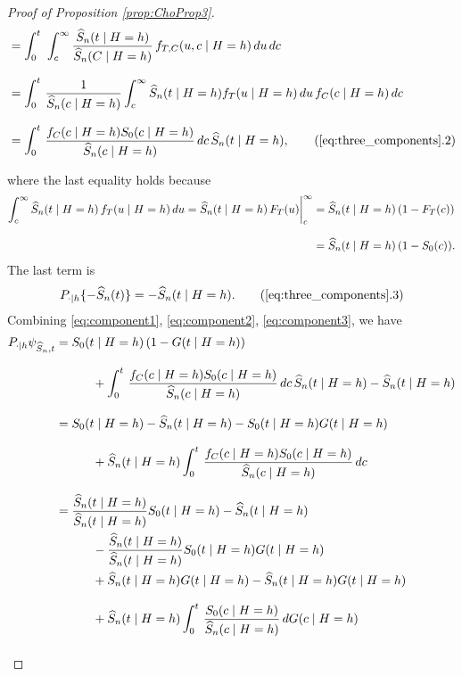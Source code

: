 \begin{proof}[Proof of Proposition \ref{prop:ChoProp3}]
{\begin{align}
&=\intzerotot \, \intc \fracCheh \, f_{T,C}(u,c \mid \heh )\, du \, dc \notag \eqnspace
&=\intzerotot \frac{1}{\Snhat\argcheh} \intc \Snhat\argtheh f_T\arguheh \, du \, f_C\argcheh \, dc \notag \eqnspace
&= \intzerotot \frac{f_C\argcheh\truesurv\argcheh}{\Snhat\argcheh}\, dc \, \Snhat\argtheh, \tag{\ref{eq:three_components}.2}
\end{align}

where the last equality holds because \begin{align*}
\intc \Snhat\argtheh \, f_T\arguheh \, du = \Snhat\argtheh \, F_T\argu \bigg|^\infty_c &= \Snhat\argtheh \, (1-F_T\argc) \eqnspace &= \Snhat\argtheh \, (1- \truesurv\argc).
\end{align*}
The last term is
\begin{align}
\label{eq:component3}
\Pd \{ -\Snhat\argt\} 
= -\Snhat\argtheh.
\tag{\ref{eq:three_components}.3}
\end{align}
\newcommand{\fracsn}{\frac{\Snhat\argtheh}{\Snhat\argtheh}}
\newcommand{\fracSoSn}{\frac{\truesurv\argtheh}{\Snhat\argtheh}}
Combining \cref{eq:component1}, \cref{eq:component2}, \cref{eq:component3}, we have
\begin{align*}
\PdotSnhat &= 
\truesurv(t\mid \heh)\left( 1 - G(t\mid \heh) \right) \eqnspace
&\quad\quad\quad+ \intzerotot \frac{f_C\argcheh\truesurv\argcheh}{\Snhat\argcheh}\, dc \, \Snhat\argtheh
-\Snhat\argtheh \eqnspace
&= \truesurv(t\mid \heh) -\Snhat\argtheh 
-  \truesurv(t\mid \heh) G(t\mid \heh) \eqnspace
&\quad\quad\quad+ \Snhat\argtheh\intzerotot \frac{f_C\argcheh\truesurv\argcheh}{\Snhat\argcheh}\, dc
 \eqnspace
&= \fracsn \truesurv(t\mid \heh) -\Snhat\argtheh \\
&\quad \quad \quad  
-  \fracsn \truesurv(t\mid \heh) G(t\mid \heh) \\
&\quad \quad \quad + \Snhat\argtheh G\argtheh - \Snhat\argtheh G\argtheh
\eqnspace
&\quad\quad\quad+\Snhat\argtheh\intzerotot \frac{\truesurv\argcheh}{\Snhat\argcheh}\, dG\argcheh \eqnspace

\end{align*}}
\end{proof}
